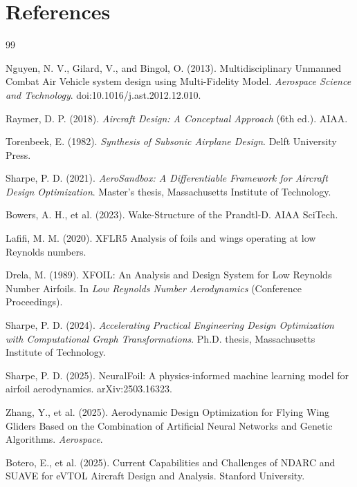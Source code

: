 \chapter*{References}

\begin{thebibliography}{99}

Nguyen, N. V., Gilard, V., and Bingol, O. (2013). Multidisciplinary Unmanned Combat Air Vehicle system design using Multi-Fidelity Model. \textit{Aerospace Science and Technology}. doi:10.1016/j.ast.2012.12.010.

Raymer, D. P. (2018). \textit{Aircraft Design: A Conceptual Approach} (6th ed.). AIAA.

Torenbeek, E. (1982). \textit{Synthesis of Subsonic Airplane Design}. Delft University Press.

Sharpe, P. D. (2021). \textit{AeroSandbox: A Differentiable Framework for Aircraft Design Optimization}. Master's thesis, Massachusetts Institute of Technology.

Bowers, A. H., et al. (2023). Wake-Structure of the Prandtl-D. AIAA SciTech.

Lafifi, M. M. (2020). XFLR5 Analysis of foils and wings operating at low Reynolds numbers.

Drela, M. (1989). XFOIL: An Analysis and Design System for Low Reynolds Number Airfoils. In \textit{Low Reynolds Number Aerodynamics} (Conference Proceedings).

Sharpe, P. D. (2024). \textit{Accelerating Practical Engineering Design Optimization with Computational Graph Transformations}. Ph.D. thesis, Massachusetts Institute of Technology.

Sharpe, P. D. (2025). NeuralFoil: A physics-informed machine learning model for airfoil aerodynamics. arXiv:2503.16323.

Zhang, Y., et al. (2025). Aerodynamic Design Optimization for Flying Wing Gliders Based on the Combination of Artificial Neural Networks and Genetic Algorithms. \textit{Aerospace}.

Botero, E., et al. (2025). Current Capabilities and Challenges of NDARC and SUAVE for eVTOL Aircraft Design and Analysis. Stanford University.


\end{thebibliography}
